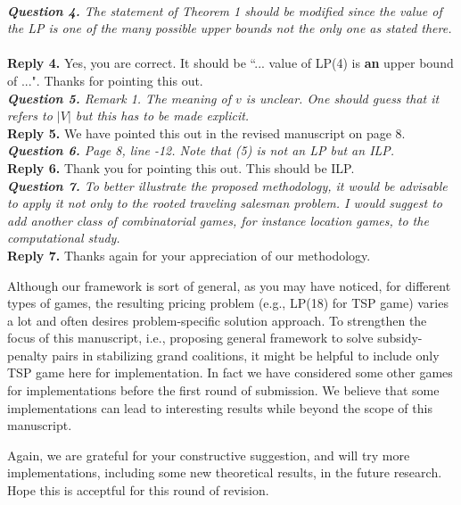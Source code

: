 \documentclass[11pt]{article}
\begin{document}
\\[4mm]
%
%
%
\noindent \textit{\textbf{Question 4.}
The statement of Theorem 1 should be modified since the value of the
LP is one of the many possible upper bounds not the only one as stated
there.
}
~\\[2mm]
\noindent \textbf{Reply 4.}
Yes, you are correct. It should be ``... value of LP(4) is {\bf an} upper bound of ...". Thanks for pointing this out.
~\\[4mm]
%
%
%
\noindent \textit{\textbf{Question 5.}
Remark 1. The meaning of $v$ is unclear. One should guess that it refers
to $|V|$ but this has to be made explicit.
}
\\[2mm]
\noindent \textbf{Reply 5.}
We have pointed this out in the revised manuscript on page 8.
\\[4mm]
%
%
%
\noindent \textit{\textbf{Question 6.}
Page 8, line -12. Note that (5) is not an LP but an ILP.
}
\\[2mm]
\noindent \textbf{Reply 6.}
Thank you for pointing this out.
This should be ILP.
\\[4mm]
%
%
%
\noindent \textit{\textbf{Question 7.}
To better illustrate the proposed methodology, it would be advisable
to apply it not only to the rooted traveling salesman problem. I would
suggest to add another class of combinatorial games, for instance location games, to the computational study.}
\\[2mm]
\noindent \textbf{Reply 7.}
Thanks again for your appreciation of our methodology.

Although our framework is sort of general, as you may have noticed, for different types of games, the resulting pricing problem (e.g., LP(18) for TSP game) varies a lot and often desires problem-specific solution approach.
To strengthen the focus of this manuscript, i.e., proposing general framework to solve subsidy-penalty pairs in stabilizing grand coalitions, it might be helpful to include only TSP game here for implementation.
In fact we have considered some other games for implementations before the first round of submission.
We believe that some implementations can lead to interesting results while beyond the scope of this manuscript.

Again, we are grateful for your constructive suggestion, and will try more implementations, including some new theoretical results, in the future research.
Hope this is acceptful for this round of revision.
\\[4mm]
%
%
\end{document}
